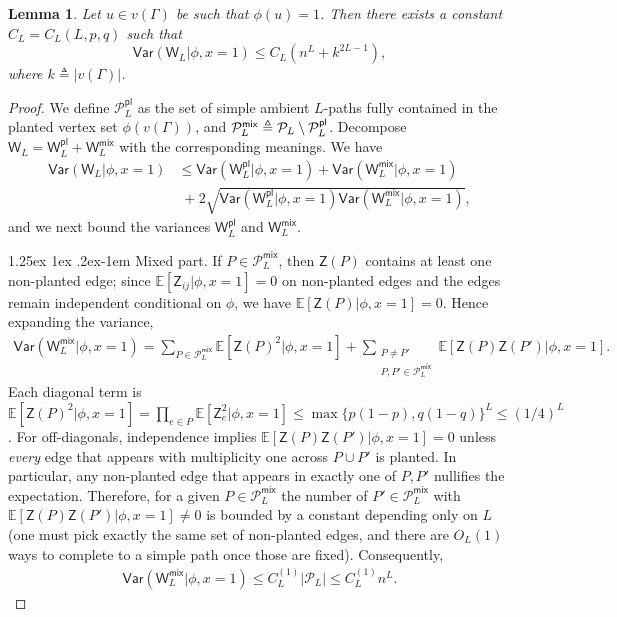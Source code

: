 \documentclass[12pt]{article}
\makeatletter
\newcommand{\bE}{\mathbb{E}}
\newtheorem{lemma}{Lemma}
\newcommand{\calP}{{\cal P}}
\newcommand{\p}[1]{\left(#1\right)}
\newcommand{\s}[1]{\mathsf{#1}}
\renewcommand{\paragraph}{%
  \@startsection{paragraph}{4}%
  {\z@}{1.25ex \@plus 1ex \@minus .2ex}{-1em}%
  {\normalfont\normalsize\bfseries}%
}
\makeatother
\begin{document}
\begin{lemma}\label{lem:planted-second-moment}
Let $u\in v(\Gamma)$ be such that $\phi(u)=1$. Then there exists a constant $C_L=C_L(L,p,q)$ such that
\begin{equation}\label{eq:var-planted-correct}
\s{Var}\p{\s{W}_L\vert \phi,x=1}\leq C_L\p{n^{L}+k^{2L-1}},
\end{equation}
where $k\triangleq|v(\Gamma)|$.
\end{lemma}

\begin{proof}
We define $\mathcal P_L^{\s{pl}}$ as the set of simple ambient $L$-paths fully contained in the planted vertex set $\phi(v(\Gamma))$, and $\mathcal P_L^{\s{mix}}\triangleq\mathcal \calP_L\setminus \mathcal P_L^{\s{pl}}$. Decompose $\s{W}_L=\s{W}_L^{\s{pl}}+\s{W}_L^{\s{mix}}$ with the corresponding meanings. We have
\begin{align}
    \s{Var}\p{\s{W}_L\vert \phi,x=1}&\leq \s{Var}\p{\s{W}_L^{\s{pl}}\vert \phi,x=1}+\s{Var}\p{\s{W}_L^{\s{mix}}\vert \phi,x=1}\nonumber\\
    &\;+2\sqrt{\s{Var}\p{\s{W}_L^{\s{pl}}\vert \phi,x=1}\s{Var}\p{\s{W}_L^{\s{mix}}\vert \phi,x=1}},
\end{align}
and we next bound the variances $\s{W}_L^{\s{pl}}$ and $\s{W}_L^{\s{mix}}$.

\paragraph{Mixed part.} If $P\in\mathcal P_L^{\s{mix}}$, then $\s{Z}(P)$ contains at least one non-planted edge; since $\bE[\s{Z}_{ij}\vert\phi,x=1]=0$ on non-planted edges and the edges remain independent conditional on $\phi$, we have $\bE[\s{Z}(P)\vert\phi,x=1]=0$.
Hence expanding the variance,
\begin{align}
\s{Var}(\s{W}_L^{\s{mix}}\vert \phi,x=1)
=\sum_{P\in\mathcal P_L^{\s{mix}}}\bE[\s{Z}(P)^2\vert \phi,x=1]
+\sum_{\substack{P\neq P'\\ P,P'\in\mathcal P_L^{\s{mix}}}}\bE[\s{Z}(P)\s{Z}(P')\vert \phi,x=1].
\end{align}
Each diagonal term is $\bE[\s{Z}(P)^2\vert \phi,x=1]=\prod_{e\in P}\bE[\s{Z}_e^2\vert \phi,x=1]\le \max\{p(1-p),q(1-q)\}^{L}\le (1/4)^L$. For off-diagonals, independence implies $\bE[\s{Z}(P)\s{Z}(P')\vert \phi,x=1]=0$ unless \emph{every} edge that appears with multiplicity one across $P\cup P'$ is planted. In particular, any non-planted edge that appears in exactly one of $P,P'$ nullifies the expectation. Therefore, for a given $P\in\mathcal P_L^{\s{mix}}$ the number of $P'\in\mathcal P_L^{\s{mix}}$ with $\bE[\s{Z}(P)\s{Z}(P')\vert \phi,x=1]\neq 0$ is bounded by a constant depending only on $L$ (one must pick exactly the same set of non-planted edges, and there are $O_L(1)$ ways to complete to a simple path once those are fixed). Consequently,
\begin{align}
\s{Var}(\s{W}_L^{\s{mix}}\vert\phi,x=1)\leq C_L^{(1)}|\mathcal P_L|\leq C_L^{(1)}n^{L}.
\end{align}


\end{proof}
\end{document}
